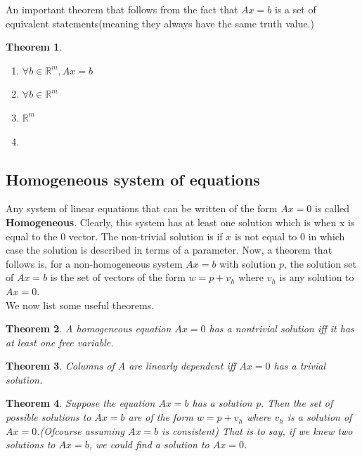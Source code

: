 \documentclass{article}
\newtheorem{thm}{Theorem}[subsection]
\numberwithin{equation}{subsection}
\begin{document}
An important theorem that follows from the fact that $Ax=b$ is a set of equivalent statements(meaning they always have the same truth value.) 

\begin{thm}
\begin{enumerate}
    \item $\forall b \in \mathbb{R}^{m}, Ax=b$ 
    \item $ \forall b \in \mathbb{R}^{m}$ 
    \item {} $\mathbb{R}^{m}$
    \item {}
\end{enumerate}
\end{thm}

\subsection{Homogeneous system of equations}

Any system of linear equations that can be written of the form $Ax = 0$ is called \textbf{Homogeneous}. Clearly, this system has at least one solution which is when x is equal to the 0 vector. The non-trivial solution is if $x$ is not equal to 0 in which case the solution is described in terms of a parameter. Now, a theorem that follows is, for a non-homogeneous system $Ax=b$ with solution $p$, the solution set of $Ax=b$ is the set of vectors of the form $w = p + v_{h}$ where $v_{h}$ is any solution to $Ax = 0$.
\\ We now list some useful theorems. 
\begin{thm}
A homogeneous equation $Ax = 0$ has a nontrivial solution iff it has at least one free variable.
\end{thm}

\begin{thm}
Columns of A are linearly dependent iff $Ax=0$ has a trivial solution.
\end{thm}

\begin{thm}
Suppose the equation $Ax=b$ has a solution p. Then the set of possible solutions to $Ax=b$ are of the form $w = p + v_{h}$ where $v_{h}$ is a solution of $Ax = 0$.(Ofcourse assuming $Ax=b$ is consistent) That is to say, if we knew two solutions to $Ax=b$, we could find a solution to $Ax=0$. 
\end{thm}
\end{document}
